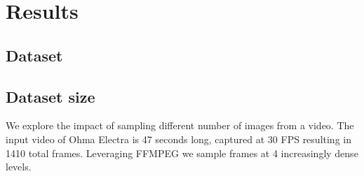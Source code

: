 \chapter{Results}

\begin{comment}

Experiments:
- Explore the impact of capturing
    - Capturing NeRFs in different ways
        - Walking, standing still, sparsely, densely, linearly, around an object
    - Capturing video, images, polycam
        - Better/worse quality with polycam or COLMAP
    - Capturing different kind of scenes
        - Bounded/Unbounded 
    - Capturing in different conditions
    - Capturing 
    
- Explore the impact of dataset size
    - Extract different amounts of images from the video ✅
        - Simulate driving by walking up and back a street multiple times ✅
    - How much data is required until COLMAP becomes a bottleneck

- Explore the impact of area-size
    - Remember to point out that area is poorly defined since scale is perspective relative, depending on the level of detail you want. ✅
    - Area must be defined for a certain scene type. E.g. street view, aerial view, unbounded in multiple directions, bounded in all directions

- Explore the impact of different methods
    - instant-npg, nerfacto, NeRF

Metrics
- Quantitative
    - PSNR, LPIPS, SSIM
- Qualitative
    - Compare images side-by-side



Research questions:
- To what extent does a good capture impact the result of a NeRF
- How much data is required until COLMAP becomes a bottleneck?
- What is the capacity of a NeRF when optimizing a street view scene?

SCENES:
- Bounded scene
- Unbounded scene
- Walking
- Standing still
- Street-view
\end{comment}



\section{Dataset}





\section{Dataset size}
We explore the impact of sampling different number of images from a video. The input video of Ohma Electra \cite{data:object-unbounded-ohma} is 47 seconds long, captured at 30 FPS resulting in 1410 total frames. Leveraging FFMPEG we sample frames at 4 increasingly dense levels.

